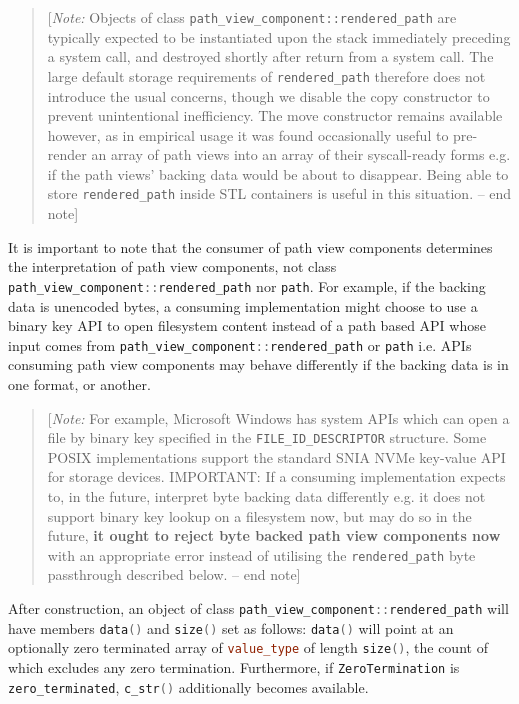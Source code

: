 \documentclass[11pt]{article}
\newcommand{\code}[2][cpp]{\lstinline[language=#1,basicstyle=\small\ttfamily]{#2}}
\newcommand{\note}[1]{\begin{quote}[\textit{Note:} #1 -- end note]\end{quote}}
\begin{document}
\color{black}

\note{Objects of class \code{path_view_component::rendered_path} are typically expected to be instantiated upon the stack immediately preceding a system call, and destroyed shortly after return from a system call. The large default storage requirements of \code{rendered_path} therefore does not introduce the usual concerns, though we disable the copy constructor to prevent unintentional inefficiency. The move constructor remains available however, as in empirical usage it was found occasionally useful to pre-render an array of path views into an array of their syscall-ready forms e.g. if the path views' backing data would be about to disappear. Being able to store \code{rendered_path} inside STL containers is useful in this situation.}

\color{darkgreen}

It is important to note that the consumer of path view components determines the interpretation of path view components, not class \code{path_view_component::rendered_path} nor \code{path}. For example, if the backing data is unencoded bytes, a consuming implementation might choose to use a binary key API to open filesystem content instead of a path based API whose input comes from \code{path_view_component::rendered_path} or \code{path} i.e. APIs consuming path view components may behave differently if the backing data is in one format, or another.

\color{black}

\note{For example, Microsoft Windows has system APIs which can open a file by binary key specified in the \code{FILE_ID_DESCRIPTOR} structure. Some POSIX implementations support the standard SNIA NVMe key-value API for storage devices. IMPORTANT: If a consuming implementation expects to, in the future, interpret byte backing data differently e.g. it does not support binary key lookup on a filesystem now, but may do so in the future, \textbf{it ought to reject byte backed path view components now} with an appropriate error instead of utilising the \code{rendered_path} byte passthrough described below.}

\color{darkgreen}

After construction, an object of class \code{path_view_component::rendered_path} will have members \code{data()} and \code{size()} set as follows: \code{data()} will point at an optionally zero terminated array of \code{value_type} of length \code{size()}, the count of which excludes any zero termination. Furthermore, if \code{ZeroTermination} is \code{zero_terminated}, \code{c_str()} additionally becomes available.
\end{document}
